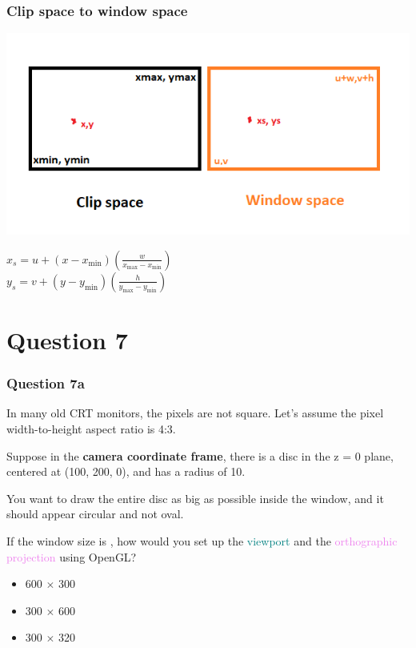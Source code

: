 \documentclass{beamer}
\begin{document}
\begin{frame}
    \frametitle{Clip space to window space}

    \begin{center}
        \includegraphics[]{clip-window.png}
    \end{center}
    
    $x_s = u + (x-x_{\min}) (\frac{w}{x_{\max} - x_{\min}})$\\
    $y_s = v + (y-y_{\min}) (\frac{h}{y_{\max} - y_{\min}})$\\

\end{frame}

\section{Question 7}

\begin{frame}
    \frametitle{Question 7a}
    In many old CRT monitors, the pixels are not square. 
    Let’s assume the pixel width-to-height aspect ratio is 4:3. 
    \vspace{1em}

    Suppose in the \textbf{camera coordinate frame}, there is a disc in the z = 0 plane, 
    centered at (100, 200, 0), and has a radius of 10. 

    You want to draw the entire disc as big as possible inside the window, 
    and it should appear circular and not oval.
    \vspace{1em}

    \begin{tcolorbox}
        If the window size is \underline{\quad\quad}, how would you set up the \textcolor{teal}{viewport} and the
        \textcolor{violet}{orthographic projection} using OpenGL?
        \begin{itemize}
            \item 600 $\times$ 300
            \item 300 $\times$ 600
            \item 300 $\times$ 320
        \end{itemize}
    \end{tcolorbox}
\end{frame}
\end{document}

